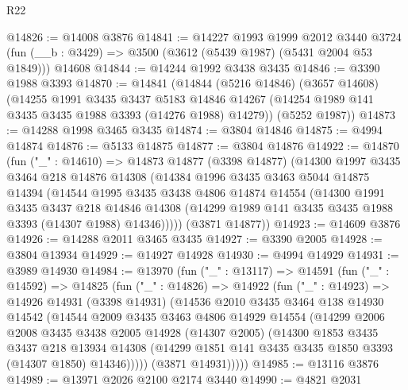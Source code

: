 \begin{lexlean}{R22}
\begin{coremodule}
@14826 := @14008 @3876
@14841 := @14227
    @1993
    @1999
    @2012
    @3440
    @3724
    (fun (__b : @3429) => @3500 (@3612 (@5439 @1987) (@5431 @2004 @53 @1849)))
    @14608
@14844 := @14244 @1992 @3438 @3435
@14846 := @3390 @1988 @3393
@14870 := @14841
    (@14844
      (@5216 @14846)
      (@3657 @14608)
      (@14255
        @1991
        @3435
        @3437
        @5183
        @14846
        @14267
        (@14254 @1989 @141 @3435 @3435 @1988 @3393 (@14276 @1988) @14279))
      (@5252 @1987))
@14873 := @14288 @1998 @3465 @3435
@14874 := @3804 @14846
@14875 := @4994 @14874
@14876 := @5133 @14875
@14877 := @3804 @14876
@14922 := @14870
    (fun ("_" : @14610) =>
    @14873
      @14877
      (@3398 @14877)
      (@14300
        @1997
        @3435
        @3464
        @218
        @14876
        @14308
        (@14384
          @1996
          @3435
          @3463
          @5044
          @14875
          @14394
          (@14544
            @1995
            @3435
            @3438
            @4806
            @14874
            @14554
            (@14300
              @1991
              @3435
              @3437
              @218
              @14846
              @14308
              (@14299 @1989 @141 @3435 @3435 @1988 @3393 (@14307 @1988) @14346)))))
      (@3871 @14877))
@14923 := @14609 @3876
@14926 := @14288 @2011 @3465 @3435
@14927 := @3390 @2005
@14928 := @3804 @13934
@14929 := @14927 @14928
@14930 := @4994 @14929
@14931 := @3989 @14930
@14984 := @13970
    (fun ("_" : @13117) =>
    @14591
      (fun ("_" : @14592) =>
      @14825
        (fun ("_" : @14826) =>
        @14922
          (fun ("_" : @14923) =>
          @14926
            @14931
            (@3398 @14931)
            (@14536
              @2010
              @3435
              @3464
              @138
              @14930
              @14542
              (@14544
                @2009
                @3435
                @3463
                @4806
                @14929
                @14554
                (@14299
                  @2006
                  @2008
                  @3435
                  @3438
                  @2005
                  @14928
                  (@14307 @2005)
                  (@14300
                    @1853
                    @3435
                    @3437
                    @218
                    @13934
                    @14308
                    (@14299 @1851 @141 @3435 @3435 @1850 @3393 (@14307 @1850) @14346)))))
            (@3871 @14931)))))
@14985 := @13116 @3876
@14989 := @13971 @2026 @2100 @2174 @3440
@14990 := @4821 @2031

\end{coremodule}
\end{lexlean}
